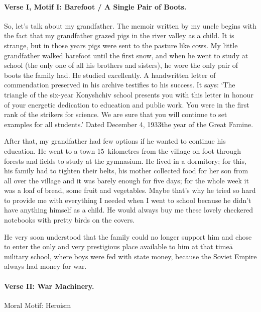 \fugue

\paragraph{Verse I, Motif I: Barefoot / A Single Pair of Boots.}\strut

So, let's talk about my grandfather. The memoir written by my uncle
begins with the fact that my grandfather grazed pigs in the river
valley as a child. It is strange, but in those years pigs were sent to
the pasture like cows. My little grandfather walked barefoot until the
first snow, and when he went to study at school (the only one of all
his brothers and sisters), he wore the only pair of boots the family
had. He studied excellently. A handwritten letter of commendation
preserved in his archive testifies to his success. It says: `The
triangle of the six-year Konyshchiv school presents you with this
letter in honour of your energetic dedication to education and public
work. You were in the first rank of the strikers for science. We are
sure that you will continue to set examples for all students.' Dated
December 4, 1933\=the year of the Great Famine.

After that, my grandfather had few options if he wanted to continue
his education. He went to a town 15~kilometres from the village on
foot through forests and fields to study at the gymnasium. He lived in
a dormitory; for this, his family had to tighten their belts, his
mother collected food for her son from all over the village and it was
barely enough for five days; for the whole week it was a loaf of
bread, some fruit and vegetables. Maybe that's why he tried so hard
to provide me with everything I needed when I went to school because
he didn't have anything himself as a child. He would always buy me
these lovely checkered notebooks with pretty birds on the covers.

He very soon understood that the family could no longer support him
and chose to enter the only and very prestigious place available to
him at that time\=a military school, where boys were fed with state
money, because the Soviet Empire always had money for war.

\clearpage

\paragraph{Verse II: War Machinery.}\strut

Moral Motif: Heroism

